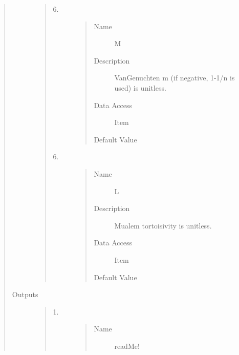 \documentclass[letterpaper,10pt,english]{sphinxmanual}
\begin{document}
\begin{quote}
\begin{description}
\begin{quote}
\begin{description}
\item[{6.}] \leavevmode\begin{quote}\begin{description}
\item[{Name}] \leavevmode
M

\item[{Description}] \leavevmode
VanGenuchten m (if negative, 1-1/n is used) is unitless.

\item[{Data Access}] \leavevmode
Item

\item[{Default Value}] \leavevmode
{}

\end{description}\end{quote}

\item[{6.}] \leavevmode\begin{quote}\begin{description}
\item[{Name}] \leavevmode
L

\item[{Description}] \leavevmode
Mualem tortoisivity is unitless.

\item[{Data Access}] \leavevmode
Item

\item[{Default Value}] \leavevmode
{}

\end{description}\end{quote}

\end{description}\end{quote}

\item[{Outputs}] \leavevmode\begin{quote}\begin{description}
\item[{1.}] \leavevmode\begin{quote}\begin{description}
\item[{Name}] \leavevmode
readMe!


\end{description}
\end{quote}
\end{description}
\end{quote}
\end{description}
\end{quote}
\end{document}
